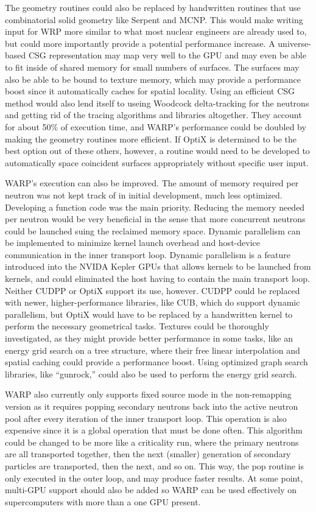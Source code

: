 The geometry routines could also be replaced by handwritten routines that use combinatorial solid geometry like Serpent and MCNP.  This would make writing input for WRP more similar to what most nuclear engineers are already used to, but could more importantly provide a potential performance increase.  A universe-based CSG representation may map very well to the GPU and may even be able to fit inside of shared memory for small numbers of surfaces.  The surfaces may also be able to be bound to texture memory, which may provide a performance boost since it automatically caches for spatial locality.  Using an efficient CSG method would also lend itself to useing Woodcock delta-tracking for the neutrons and getting rid of the tracing algorithms and libraries altogether.  They account for about 50\% of execution time, and WARP's performance could be doubled by making the geometry routines more efficient.  If OptiX is determined to be the best option out of these others, however, a routine would need to be developed to automatically space coincident surfaces appropriately without specific user input.

WARP's execution can also be improved.  The amount of memory required per neutron was not kept track of in initial development, much less optimized.  Developing a function code was the main priority.  Reducing the memory needed per neutron would be very beneficial in the sense that more concurrent neutrons could be launched suing the reclaimed memory space.  Dynamic parallelism can be implemented to minimize kernel launch overhead and host-device communication in the inner transport loop.  Dynamic parallelism is a feature introduced into the NVIDA Kepler GPUs that allows kernels to be launched from kernels, and could eliminated the host having to contain the main transport loop.  Neither CUDPP or OptiX support its use, however.  CUDPP could be replaced with newer, higher-performance libraries, like CUB, which do support dynamic parallelism, but OptiX would have to be replaced by a handwritten kernel to perform the necessary geometrical tasks.  Textures could be thoroughly investigated, as they might provide better performance in some tasks, like an energy grid search on a tree structure, where their free linear interpolation and spatial caching could provide a performance boost.    Using optimized graph search libraries, like ``gunrock,'' could also be used to perform the energy grid search.

WARP also currently only supports fixed source mode in the non-remapping version as it requires popping secondary neutrons back into the active neutron pool after every iteration of the inner transport loop.  This operation is also expensive since it is a global operation that must be done often.  This algorithm could be changed to be more like a criticality run, where the primary neutrons are all transported together, then the next (smaller) generation of secondary particles are transported, then the next, and so on.  This way, the pop routine is only executed in the outer loop, and may produce faster results.   At some point, multi-GPU support should also be added so WARP can be used effectively on supercomputers with more than a one GPU present.

